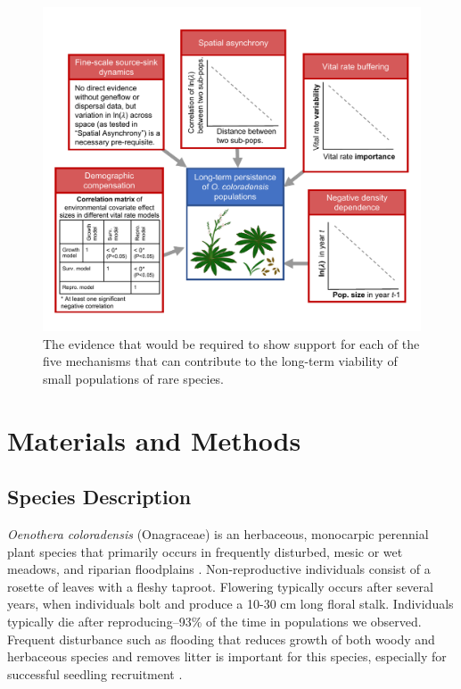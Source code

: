 \documentclass[12pt, letterpaper]{article}
\begin{document}
\begin{figure}[h!]
  \centering
  \includegraphics[width=1\textwidth]{COBP_conceptualDiagram.pdf}
  \caption{
  \internallinenumbers The evidence that would be required to show support for each of the five mechanisms that can contribute to the long-term viability of small populations of rare species.}
  \label{fig:conceptualFigure}
\end{figure} 

\section{Materials and Methods}

\subsection{Species Description}  
\textit{Oenothera coloradensis} (Onagraceae) \cite{Wagner2013-ii} is an herbaceous, monocarpic perennial plant species that primarily occurs in frequently disturbed, mesic or wet meadows, and riparian floodplains
\cite{Fertig2000-ow}. Non-reproductive individuals consist of a rosette of leaves with a fleshy taproot. Flowering typically occurs after several years, when individuals bolt and produce a 10-30 cm long floral stalk. Individuals typically die after reproducing--93\% of the time in populations we observed. Frequent disturbance such as flooding that reduces growth of both woody and herbaceous species and removes litter is important for this species, especially for successful seedling recruitment \cite{Fertig2000-ow, Burgess2003}. 
\end{document}

